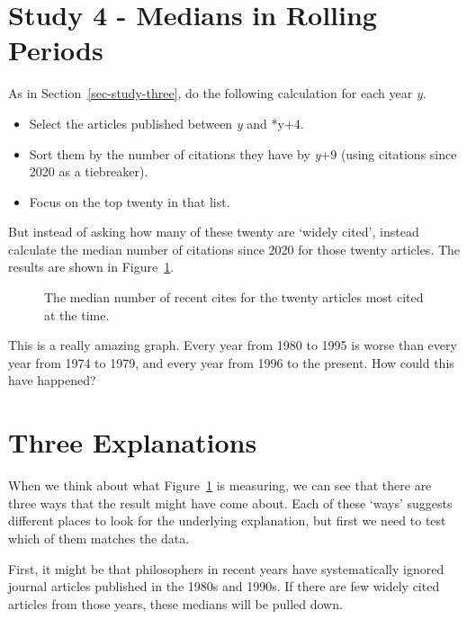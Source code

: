 \documentclass[
  10pt,
  letterpaper,
  DIV=11,
  numbers=noendperiod,
  twoside]{scrartcl}
\providecommand{\tightlist}{%
  \setlength{\itemsep}{0pt}\setlength{\parskip}{0pt}}\usepackage{longtable,booktabs,array}
\begin{document}
\section{Study 4 - Medians in Rolling Periods}\label{sec-study-four}

As in Section~\ref{sec-study-three}, do the following calculation for
each year \emph{y}.

\begin{itemize}
\tightlist
\item
  Select the articles published between \emph{y} and *y+4.
\item
  Sort them by the number of citations they have by \emph{y}+9 (using
  citations since 2020 as a tiebreaker).
\item
  Focus on the top twenty in that list.
\end{itemize}

But instead of asking how many of these twenty are `widely cited',
instead calculate the median number of citations since 2020 for those
twenty articles. The results are shown in Figure~\ref{fig-all-median}.

\begin{figure}


\caption{\label{fig-all-median}The median number of recent cites for the
twenty articles most cited at the time.}

\end{figure}%

This is a really amazing graph. Every year from 1980 to 1995 is worse
than every year from 1974 to 1979, and every year from 1996 to the
present. How could this have happened?

\section{Three Explanations}\label{sec-three-explanations}

When we think about what Figure~\ref{fig-all-median} is measuring, we
can see that there are three ways that the result might have come about.
Each of these `ways' suggests different places to look for the
underlying explanation, but first we need to test which of them matches
the data.

First, it might be that philosophers in recent years have systematically
ignored journal articles published in the 1980s and 1990s. If there are
few widely cited articles from those years, these medians will be pulled
down.
\end{document}
